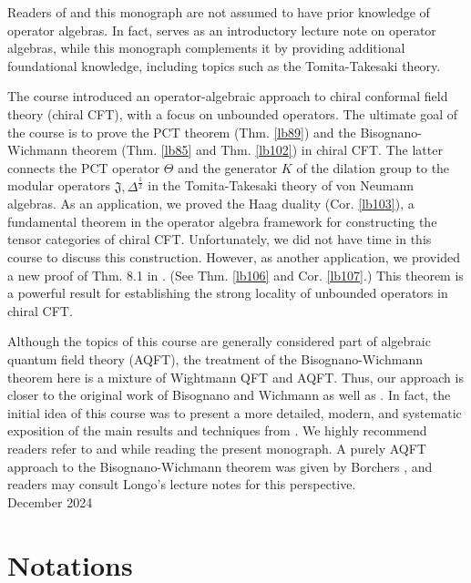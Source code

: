 \documentclass[12pt,b5paper,notitlepage]{article}
\theoremstyle{definition}
\theoremstyle{plain}
\newcommand{\fk}{\mathfrak}
\newcommand{\half}{\frac{1}{2}}
\numberwithin{equation}{section}
\begin{document}
Readers of \cite{Gui-S} and this monograph are not assumed to have prior knowledge of operator algebras.  In fact, \cite{Gui-S} serves as an introductory lecture note on operator algebras, while this monograph complements it by providing additional foundational knowledge, including topics such as the Tomita-Takesaki theory.

The course introduced an operator-algebraic approach to chiral conformal field theory (chiral CFT), with a focus on unbounded operators. The ultimate goal of the course is to prove the PCT theorem (Thm. \ref{lb89}) and the Bisognano-Wichmann theorem (Thm. \ref{lb85} and Thm. \ref{lb102}) in chiral CFT. The latter connects the PCT operator $\Theta$ and the generator $K$ of the dilation group to the modular operators $\fk J,\Delta^\half$ in the Tomita-Takesaki theory of von Neumann algebras. As an application, we proved the Haag duality (Cor. \ref{lb103}), a fundamental theorem in the operator algebra framework for constructing the tensor categories of chiral CFT. Unfortunately, we did not have time in this course to discuss this construction. However, as another application, we provided a new proof of Thm. 8.1 in \cite{CKLW18}. (See Thm. \ref{lb106} and Cor. \ref{lb107}.) This theorem is a powerful result for establishing the strong locality of unbounded operators in chiral CFT.

Although the topics of this course are generally considered part of algebraic quantum field theory (AQFT), the treatment of the Bisognano-Wichmann theorem here is a mixture of Wightmann QFT and AQFT. Thus, our approach is closer to the original work of Bisognano and Wichmann \cite{BW75} as well as \cite{BS90}. In fact, the initial idea of this course was to present a more detailed, modern, and systematic exposition of the main results and techniques from \cite{BS90}. We highly recommend readers refer to \cite{BW75} and \cite{BS90} while reading the present monograph. A purely AQFT approach to the Bisognano-Wichmann theorem was given by Borchers \cite{Bor92}, and readers may consult Longo's lecture notes \cite{Lon08} for this perspective.\\[2ex]

\hfill December 2024





\newpage


\section{Notations}
\end{document}
